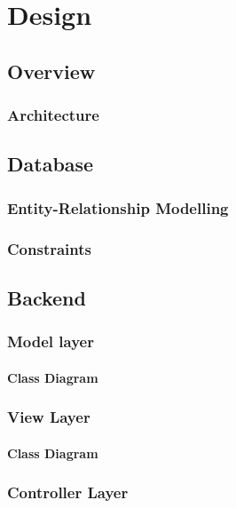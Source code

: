 \chapter{Design}

\section{Overview}

\subsection{Architecture}

\section{Database}

\subsection{Entity-Relationship Modelling}

\subsection{Constraints}

\section{Backend}

\subsection{Model layer}

\subsubsection{Class Diagram}

\subsection{View Layer}

\subsubsection{Class Diagram}

\subsection{Controller Layer}

